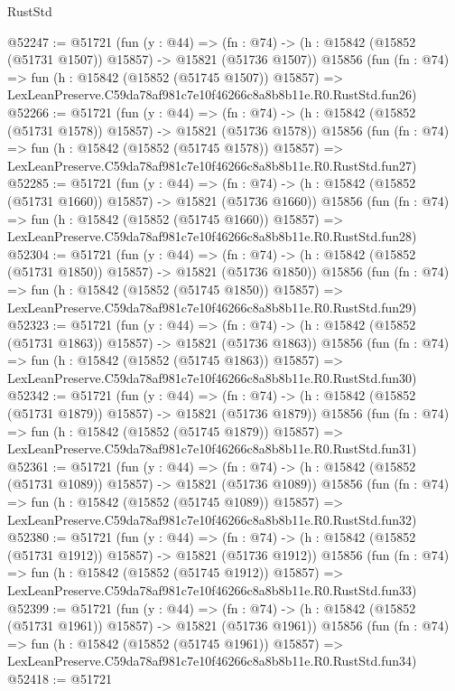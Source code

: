 \begin{lexlean}{RustStd}
\begin{coremodule}
@52247 := @51721
    (fun (y : @44) =>
    (fn : @74) -> (h : @15842 (@15852 (@51731 @1507)) @15857) -> @15821 (@51736 @1507))
    @15856
    (fun (fn : @74) =>
    fun (h : @15842 (@15852 (@51745 @1507)) @15857) =>
    LexLeanPreserve.C59da78af981c7e10f46266c8a8b8b11e.R0.RustStd.fun26)
@52266 := @51721
    (fun (y : @44) =>
    (fn : @74) -> (h : @15842 (@15852 (@51731 @1578)) @15857) -> @15821 (@51736 @1578))
    @15856
    (fun (fn : @74) =>
    fun (h : @15842 (@15852 (@51745 @1578)) @15857) =>
    LexLeanPreserve.C59da78af981c7e10f46266c8a8b8b11e.R0.RustStd.fun27)
@52285 := @51721
    (fun (y : @44) =>
    (fn : @74) -> (h : @15842 (@15852 (@51731 @1660)) @15857) -> @15821 (@51736 @1660))
    @15856
    (fun (fn : @74) =>
    fun (h : @15842 (@15852 (@51745 @1660)) @15857) =>
    LexLeanPreserve.C59da78af981c7e10f46266c8a8b8b11e.R0.RustStd.fun28)
@52304 := @51721
    (fun (y : @44) =>
    (fn : @74) -> (h : @15842 (@15852 (@51731 @1850)) @15857) -> @15821 (@51736 @1850))
    @15856
    (fun (fn : @74) =>
    fun (h : @15842 (@15852 (@51745 @1850)) @15857) =>
    LexLeanPreserve.C59da78af981c7e10f46266c8a8b8b11e.R0.RustStd.fun29)
@52323 := @51721
    (fun (y : @44) =>
    (fn : @74) -> (h : @15842 (@15852 (@51731 @1863)) @15857) -> @15821 (@51736 @1863))
    @15856
    (fun (fn : @74) =>
    fun (h : @15842 (@15852 (@51745 @1863)) @15857) =>
    LexLeanPreserve.C59da78af981c7e10f46266c8a8b8b11e.R0.RustStd.fun30)
@52342 := @51721
    (fun (y : @44) =>
    (fn : @74) -> (h : @15842 (@15852 (@51731 @1879)) @15857) -> @15821 (@51736 @1879))
    @15856
    (fun (fn : @74) =>
    fun (h : @15842 (@15852 (@51745 @1879)) @15857) =>
    LexLeanPreserve.C59da78af981c7e10f46266c8a8b8b11e.R0.RustStd.fun31)
@52361 := @51721
    (fun (y : @44) =>
    (fn : @74) -> (h : @15842 (@15852 (@51731 @1089)) @15857) -> @15821 (@51736 @1089))
    @15856
    (fun (fn : @74) =>
    fun (h : @15842 (@15852 (@51745 @1089)) @15857) =>
    LexLeanPreserve.C59da78af981c7e10f46266c8a8b8b11e.R0.RustStd.fun32)
@52380 := @51721
    (fun (y : @44) =>
    (fn : @74) -> (h : @15842 (@15852 (@51731 @1912)) @15857) -> @15821 (@51736 @1912))
    @15856
    (fun (fn : @74) =>
    fun (h : @15842 (@15852 (@51745 @1912)) @15857) =>
    LexLeanPreserve.C59da78af981c7e10f46266c8a8b8b11e.R0.RustStd.fun33)
@52399 := @51721
    (fun (y : @44) =>
    (fn : @74) -> (h : @15842 (@15852 (@51731 @1961)) @15857) -> @15821 (@51736 @1961))
    @15856
    (fun (fn : @74) =>
    fun (h : @15842 (@15852 (@51745 @1961)) @15857) =>
    LexLeanPreserve.C59da78af981c7e10f46266c8a8b8b11e.R0.RustStd.fun34)
@52418 := @51721

\end{coremodule}
\end{lexlean}
